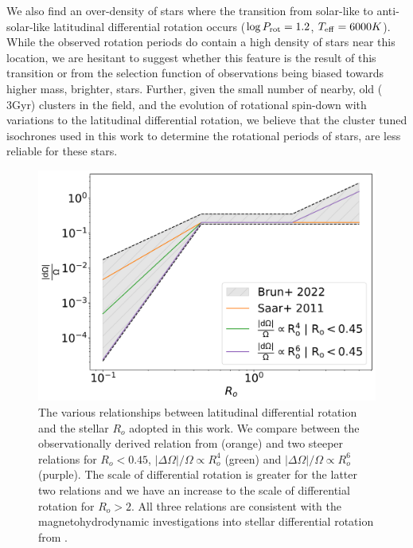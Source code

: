 We also find an over-density of stars where the transition from solar-like to anti-solar-like latitudinal differential rotation occurs ($\log P_{\rm{rot}} = 1.2$, $T_{\rm{eff}} = 6000K$).
While the observed \kepler{} rotation periods do contain a high density of stars near this location, we are hesitant to suggest whether this feature is the result of this transition or from the selection function of \kepler{} observations being biased towards higher mass, brighter, stars.
Further, given the small number of nearby, old ($\>$3Gyr) clusters in the \kepler{} field, and the evolution of rotational spin-down with variations to the latitudinal differential rotation, we believe that the cluster tuned isochrones used in this work to determine the rotational periods of stars, are less reliable for these stars.

\begin{figure}
\centering
    \includegraphics[width=\textwidth]{Figures/rot_gap_figures/comparison_diffrot.png}
    \caption{
    	The various relationships between latitudinal differential rotation and the stellar $R_o$ adopted in this work. We compare between the observationally derived relation from \citet{saar_2011} (orange) and two steeper relations for $R_o<0.45$, $|\Delta \Omega|/\Omega \propto R_o^4$ (green) and $|\Delta \Omega|/\Omega \propto R_o^6$ (purple). The scale of differential rotation is greater for the latter two relations and we have an increase to the scale of differential rotation for $R_o>2$. All three relations are consistent with the magnetohydrodynamic investigations into stellar differential rotation from \citet{brun_2022}.
}
    \label{fig:compar_diffrot}
\end{figure}

